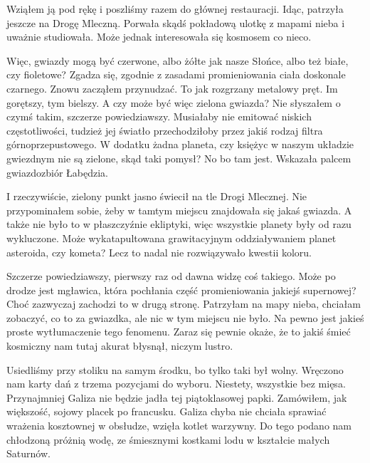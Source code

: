 Wziąłem ją pod rękę i poszliśmy razem do głównej restauracji.
Idąc, patrzyła jeszcze na Drogę Mleczną. Porwała skądś pokładową ulotkę z mapami nieba i uważnie studiowała.
Może jednak interesowała się kosmosem co nieco.

\begin{dialogue}
	\ds{} Więc, gwiazdy mogą być czerwone, albo żółte jak nasze Słońce, albo też białe, czy fioletowe?
	\ds{} Zgadza się, zgodnie z zasadami promieniowania ciała doskonale czarnego. \dm{} Znowu zacząłem przynudzać. \dm{} To jak rozgrzany metalowy pręt.
		Im gorętszy, tym bielszy.
	\ds{} A czy może być więc zielona gwiazda?
	\ds{} Nie słyszałem o czymś takim, szczerze powiedziawszy. Musiałaby nie emitować niskich częstotliwości, tudzież jej światło przechodziłoby przez jakiś rodzaj filtra górnoprzepustowego.
		W dodatku żadna planeta, czy księżyc w naszym układzie gwiezdnym nie są zielone, skąd taki pomysł?
	\ds{} No bo tam jest. \dm{} Wskazała palcem gwiazdozbiór Łabędzia.
\end{dialogue}

I rzeczywiście, zielony punkt jasno świecił na tle Drogi Mlecznej.
Nie przypominałem sobie, żeby w tamtym miejscu znajdowała się jakaś gwiazda.
A także nie było to w płaszczyźnie ekliptyki, więc wszystkie planety były od razu wykluczone.
Może wykatapultowana grawitacyjnym oddziaływaniem planet asteroida, czy kometa?
Lecz to nadal nie rozwiązywało kwestii koloru.

\begin{dialogue}
	\ds{} Szczerze powiedziawszy, pierwszy raz od dawna widzę coś takiego. Może po drodze jest mgławica, która pochłania część promieniowania jakiejś supernowej? 
		Choć zazwyczaj zachodzi to w drugą stronę.
	\ds{} Patrzyłam na mapy nieba, chciałam zobaczyć, co to za gwiazdka, ale nic w tym miejscu nie było.
	\ds{} Na pewno jest jakieś proste wytłumaczenie tego fenomenu. Zaraz się pewnie okaże, że to jakiś śmieć kosmiczny nam tutaj akurat błysnął, niczym lustro.
\end{dialogue}

Usiedliśmy przy stoliku na samym środku, bo tylko taki był wolny.
Wręczono nam karty dań z trzema pozycjami do wyboru. Niestety, wszystkie bez mięsa. Przynajmniej Galiza nie będzie jadła tej piątoklasowej papki.
Zamówiłem, jak większość, sojowy placek po francusku.
Galiza chyba nie chciała sprawiać wrażenia kosztownej w obsłudze, wzięła kotlet warzywny.
Do tego podano nam chłodzoną próżnią wodę, ze śmiesznymi kostkami lodu w kształcie małych Saturnów.

